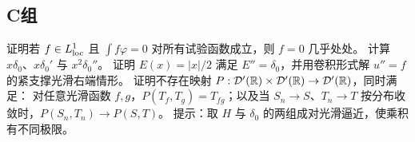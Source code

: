 \subsection*{C组}
\begin{enumerate}[label=\textbf{\thechapter.\arabic*.},resume]
证明若 \(f\in L^1_{\rm loc}\) 且 \(\int f\varphi=0\) 对所有试验函数成立，则 \(f=0\) 几乎处处。
计算 \(x\delta_0\)、\(x\delta_0'\) 与 \(x^2\delta_0''\)。
证明 \(E(x)=|x|/2\) 满足 \(E''=\delta_0\)，并用卷积形式解 \(u''=f\) 的紧支撑光滑右端情形。
证明不存在映射
\(P:\mathcal D'(\mathbb{R})\times\mathcal D'(\mathbb{R})\to\mathcal D'(\mathbb{R})\)，同时满足：
对任意光滑函数 \(f,g\)，\(P(T_f,T_g)=T_{fg}\)；以及当
\(S_n\to S\)、\(T_n\to T\) 按分布收敛时，\(P(S_n,T_n)\to P(S,T)\)。
提示：取 \(H\) 与 \(\delta_0\) 的两组成对光滑逼近，使乘积有不同极限。
\end{enumerate}
